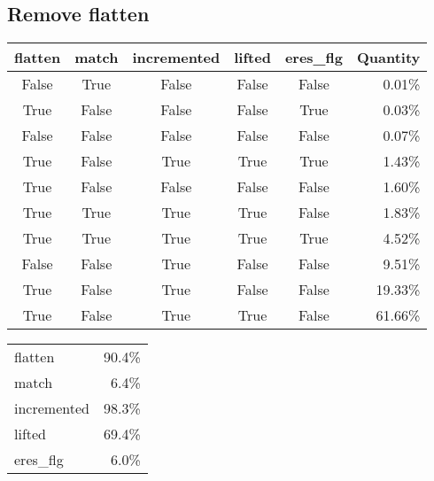 \subsection{Remove flatten}
\begin{frame}
\begin{center}
\begin{tabular}{*{5}{c} r}
flatten & match & incremented & lifted & eres\_flg & Quantity\\ \hline
False & True & False & False & False & 0.01\%\\
True & False & False & False & True & 0.03\%\\
False & False & False & False & False & 0.07\%\\
True & False & True & True & True & 1.43\%\\
True & False & False & False & False & 1.60\%\\
True & True & True & True & False & 1.83\%\\
True & True & True & True & True & 4.52\%\\
False & False & True & False & False & 9.51\%\\
True & False & True & False & False & 19.33\%\\
True & False & True & True & False & 61.66\%\\
\end{tabular}
\end{center}
\end{frame}

\begin{frame}
\begin{center}
\begin{tabular}{l r}
flatten & 90.4\%\\
match & 6.4\%\\
incremented & 98.3\%\\
lifted & 69.4\%\\
eres\_flg & 6.0\%
\end{tabular}
\end{center}
\end{frame}

